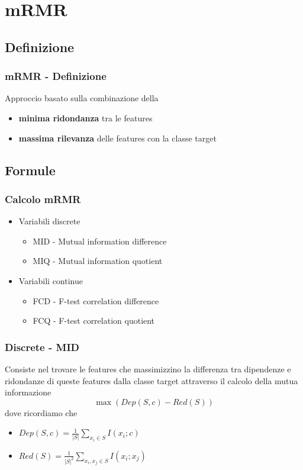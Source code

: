 \documentclass{beamer}
\begin{document}

\section{mRMR}
\subsection{Definizione}
\begin{frame}
	\frametitle{mRMR - Definizione}
	Approccio basato sulla combinazione della
	\begin{itemize}
		\item \textbf{minima ridondanza} tra le features
		\item \textbf{massima rilevanza} delle features con la classe target
	\end{itemize}
\end{frame}

\subsection{Formule}
\begin{frame}
	\frametitle{Calcolo mRMR}
	\begin{itemize}
		\item Variabili discrete
			\begin{itemize}
				\item MID - Mutual information difference
				\item MIQ - Mutual information quotient\newline
			\end{itemize}
		\item Variabili continue
			\begin{itemize}
				\item FCD - F-test correlation difference
				\item FCQ - F-test correlation quotient
			\end{itemize}
	\end{itemize}
\end{frame}
\begin{frame}
	\frametitle{Discrete - MID}
	Consiste nel trovare le features che massimizzino la differenza tra dipendenze e ridondanze di queste features dalla classe target attraverso il calcolo della mutua informazione
	$$\max (Dep(S,c) - Red(S))$$
	dove ricordiamo che
	\begin{itemize}
		\item $Dep(S,c)= \frac{1}{|S|} \sum\limits_{x_i \in S} I (x_i;c)$
		\item $Red (S)= \frac{1}{|S|^2} \sum\limits_{x_i,x_j \in S} I (x_i;x_j)$
	\end{itemize}
\end{frame}
\end{document}
